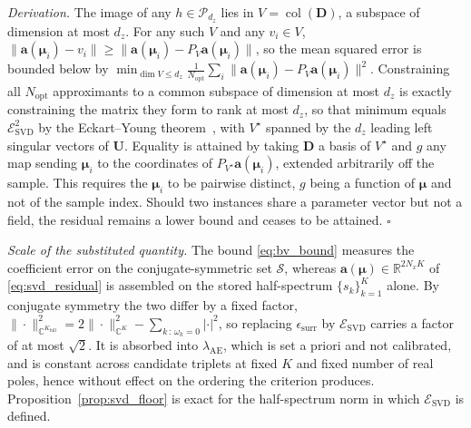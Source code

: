 ﻿\documentclass[a4paper,12pt]{article}
\theoremstyle{definition}
\theoremstyle{remark}
\newcommand{\C}{\mathbb{C}}
\newcommand{\vmu}{\bm{\mu}}
\newcommand{\R}{\mathbb{R}}
\begin{document}
\textit{Derivation.} The image of any $h \in \mathcal{P}_{d_z}$ lies in $V = \operatorname{col}(\bm{D})$, a subspace of dimension at most $d_z$. For any such $V$ and any $v_i \in V$, $\|\bm{a}(\vmu_i) - v_i\| \geq \|\bm{a}(\vmu_i) - P_V\bm{a}(\vmu_i)\|$, so the mean squared error is bounded below by $\min_{\dim V \leq d_z} \frac{1}{N_{\mathrm{opt}}}\sum_i \|\bm{a}(\vmu_i) - P_V\bm{a}(\vmu_i)\|^2$. Constraining all $N_{\mathrm{opt}}$ approximants to a common subspace of dimension at most $d_z$ is exactly constraining the matrix they form to rank at most $d_z$, so that minimum equals $\mathcal{E}_{\mathrm{SVD}}^2$ by the Eckart--Young theorem~\cite{eckart1936,mirsky1960}, with $V^\star$ spanned by the $d_z$ leading left singular vectors of $\bm{U}$. Equality is attained by taking $\bm{D}$ a basis of $V^\star$ and $g$ any map sending $\vmu_i$ to the coordinates of $P_{V^\star}\bm{a}(\vmu_i)$, extended arbitrarily off the sample. This requires the $\vmu_i$ to be pairwise distinct, $g$ being a function of $\vmu$ and not of the sample index. Should two instances share a parameter vector but not a field, the residual remains a lower bound and ceases to be attained. \hfill$\square$

\emph{Scale of the substituted quantity.} The bound \eqref{eq:bv_bound} measures the coefficient error on the conjugate-symmetric set $\mathcal{S}$, whereas $\bm{a}(\vmu) \in \R^{2N_xK}$ of \eqref{eq:svd_residual} is assembled on the stored half-spectrum $\{s_k\}_{k=1}^K$ alone. By conjugate symmetry the two differ by a fixed factor, $\|\cdot\|^2_{\C^{K_{\mathrm{full}}}} = 2\|\cdot\|^2_{\C^{K}} - \sum_{k\,:\,\omega_k = 0}|\cdot|^2$, so replacing $\epsilon_{\mathrm{surr}}$ by $\mathcal{E}_{\mathrm{SVD}}$ carries a factor of at most $\sqrt{2}$. It is absorbed into $\lambda_{\mathrm{AE}}$, which is set a priori and not calibrated, and is constant across candidate triplets at fixed $K$ and fixed number of real poles, hence without effect on the ordering the criterion produces. Proposition~\ref{prop:svd_floor} is exact for the half-spectrum norm in which $\mathcal{E}_{\mathrm{SVD}}$ is defined.
\end{document}
